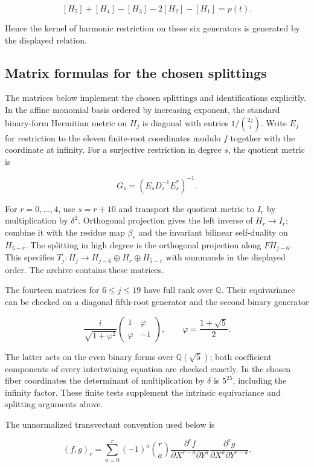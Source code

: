 \documentclass[11pt,a4paper]{article}
\begin{document}
\[
[H_5]+[H_4]-[H_3]-2[H_2]-[H_1]=p(t).
\]

Hence the kernel of harmonic restriction on these six generators is generated by the displayed relation.

\subsection{Matrix formulas for the chosen splittings}\label{subsec:F5}

The matrices below implement the chosen splittings and identifications explicitly. In the affine monomial basis ordered by increasing exponent, the standard binary-form Hermitian metric on \(H_j\) is diagonal with entries \(1/\binom{2j}{i}\). Write \(E_j\) for restriction to the eleven finite-root coordinates modulo \(f\) together with the coordinate at infinity. For a surjective restriction in degree \(s\), the quotient metric is

\[
G_s=(E_sD_s^{-1}E_s^*)^{-1}.
\]

For \(r=0,\ldots,4\), use \(s=r+10\) and transport the quotient metric to \(I_r\) by multiplication by \(\delta^2\). Orthogonal projection gives the left inverse of $H_r\to I_r$; combine it with the residue map \(\beta_r\) and the invariant bilinear self-duality on \(H_{5-r}\). The splitting in high degree is the orthogonal projection along \(FH_{j-6}\). This specifies \(T_j:H_j\to H_{j-6}\oplus H_r\oplus H_{5-r}\) with summands in the displayed order. The archive contains these matrices.

The fourteen matrices for \(6\leq j\leq19\) have full rank over \(\mathbb Q\). Their equivariance can be checked on a diagonal fifth-root generator and the second binary generator

\[
\frac{i}{\sqrt{1+\varphi^2}}
\begin{pmatrix}1&\varphi\\ \varphi&-1\end{pmatrix},
\qquad\varphi=\frac{1+\sqrt5}{2}.
\]

The latter acts on the even binary forms over \(\mathbb Q(\sqrt5)\); both coefficient components of every intertwining equation are checked exactly. In the chosen fiber coordinates the determinant of multiplication by \(\delta\) is \(5^{25}\), including the infinity factor. These finite tests supplement the intrinsic equivariance and splitting arguments above.

The unnormalized transvectant convention used below is

\[
(f,g)_r=\sum_{a=0}^{r}(-1)^a\binom ra
\frac{\partial^rf}{\partial X^{r-a}\partial Y^a}
\frac{\partial^rg}{\partial X^a\partial Y^{r-a}}.
\]
\end{document}
